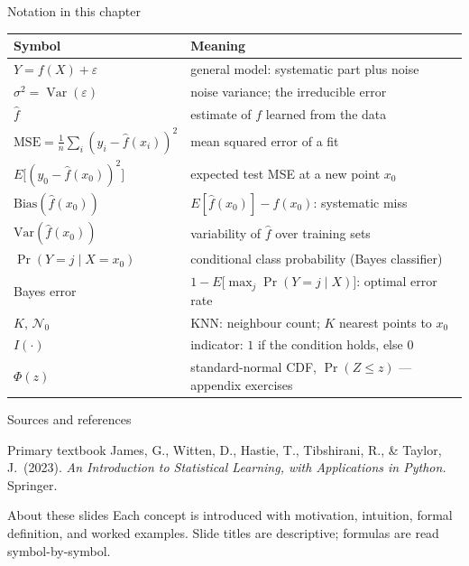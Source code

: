 \documentclass[aspectratio=169,11pt]{beamer}
\begin{document}
\begin{frame}{Notation in this chapter}
  \footnotesize
  \begin{center}
  \begin{tabular}{@{}ll@{}}
    \toprule
    \textbf{Symbol} & \textbf{Meaning} \\
    \midrule
    $Y=f(X)+\varepsilon$ & general model: systematic part plus noise \\
    $\sigma^2=\operatorname{Var}(\varepsilon)$ & noise variance; the irreducible error \\
    $\hat f$ & estimate of $f$ learned from the data \\
    $\mathrm{MSE}=\frac1n\sum_i (y_i-\hat f(x_i))^2$ & mean squared error of a fit \\
    $E\big[(y_0-\hat f(x_0))^2\big]$ & expected test MSE at a new point $x_0$ \\
    $\mathrm{Bias}(\hat f(x_0))$ & $E[\hat f(x_0)]-f(x_0)$: systematic miss \\
    $\mathrm{Var}(\hat f(x_0))$ & variability of $\hat f$ over training sets \\
    $\Pr(Y=j\mid X=x_0)$ & conditional class probability (Bayes classifier) \\
    Bayes error & $1-E\big[\max_j \Pr(Y=j\mid X)\big]$: optimal error rate \\
    $K$, $\mathcal N_0$ & KNN: neighbour count; $K$ nearest points to $x_0$ \\
    $I(\cdot)$ & indicator: $1$ if the condition holds, else $0$ \\
    $\Phi(z)$ & standard-normal CDF, $\Pr(Z\le z)$ --- appendix exercises \\
    \bottomrule
  \end{tabular}
  \end{center}
\end{frame}

\begin{frame}{Sources and references}
  \begin{block}{Primary textbook}
    James, G., Witten, D., Hastie, T., Tibshirani, R., \& Taylor, J.\ (2023).
    \emph{An Introduction to Statistical Learning, with Applications in
    Python.} Springer.
  \end{block}
  \begin{block}{About these slides}
    Each concept is introduced with motivation, intuition, formal
    definition, and worked examples. Slide titles are descriptive;
    formulas are read symbol-by-symbol.
  \end{block}
\end{frame}
\end{document}

